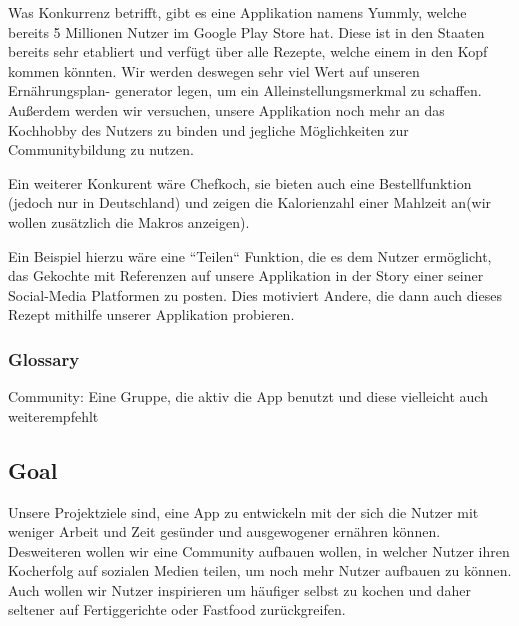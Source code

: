 \documentclass[12pt]{article}
\theoremstyle{definition}
\begin{document}
Was Konkurrenz betrifft, gibt es eine Applikation namens Yummly, welche bereits 5 Millionen Nutzer im Google Play Store hat. Diese ist in den Staaten bereits sehr etabliert und verfügt über alle Rezepte, welche einem in den Kopf kommen könnten. Wir werden deswegen sehr viel Wert auf unseren Ernährungsplan- generator legen, um ein Alleinstellungsmerkmal zu schaffen. Außerdem werden wir versuchen, unsere Applikation noch mehr an das Kochhobby des Nutzers zu binden und jegliche Möglichkeiten zur Communitybildung zu nutzen.

Ein weiterer Konkurent wäre Chefkoch, sie bieten auch eine Bestellfunktion (jedoch nur in Deutschland) und zeigen die Kalorienzahl einer Mahlzeit an(wir wollen zusätzlich die Makros anzeigen). 

Ein Beispiel hierzu wäre eine ``Teilen`` Funktion, die es dem Nutzer ermöglicht, das Gekochte mit Referenzen auf unsere Applikation in der Story einer seiner Social-Media Platformen zu posten. Dies motiviert Andere, die dann auch dieses Rezept mithilfe unserer Applikation probieren.


\subsubsection{Glossary}

Community: Eine Gruppe, die aktiv die App benutzt und diese vielleicht auch weiterempfehlt



\subsection{Goal}
Unsere Projektziele sind, eine App zu entwickeln mit der sich die Nutzer mit weniger Arbeit und Zeit gesünder und ausgewogener ernähren können. Desweiteren wollen wir eine Community aufbauen wollen, in welcher Nutzer ihren Kocherfolg auf sozialen Medien teilen, um noch mehr Nutzer aufbauen zu können. Auch wollen wir Nutzer inspirieren um häufiger selbst zu kochen und daher seltener auf Fertiggerichte oder Fastfood zurückgreifen.
\pagebreak
\end{document}
